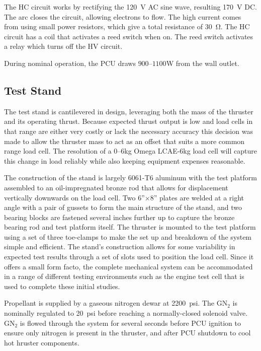 \documentclass[journal]{IEEEtran}
\begin{document}
The HC circuit works by rectifying the \SI{120}{\volt} AC sine wave, resulting \SI{170}{\volt} DC.\@
The arc closes the circuit, allowing electrons to flow.
The high current comes from using small power resistors, which give a total resistance of \SI{30}{\ohm}.
The HC circuit has a coil that activates a reed switch when on.
The reed switch activates a relay which turns off the HV circuit.

During nominal operation, the PCU draws $900$--$1100$\si{\watt} from the wall outlet.

\subsection{Test Stand}
The test stand is cantilevered in design, leveraging both the mass of the thruster and its operating thrust.
Because expected thrust output is low and load cells in that range are either very costly or lack the necessary accuracy this decision was made to allow the thruster mass to act as an offset that suits a more common range load cell.
The resolution of a 0--6\si{\kilo\gram} Omega LCAE-6kg load cell will capture this change in load reliably while also keeping equipment expenses reasonable.

The construction of the stand is largely 6061-T6 aluminum with the test platform assembled to an oil-impregnated bronze rod that allows for displacement vertically downwards on the load cell.
Two 6''$\times$8'' plates are welded at a right angle with a pair of gussets to form the main structure of the stand, and two bearing blocks are fastened several inches further up to capture the bronze bearing rod and test platform itself.
The thruster is mounted to the test platform using a set of three toe-clamps to make the set up and breakdown of the system simple and efficient.
The stand's construction allows for some variability in expected test results through a set of slots used to position the load cell. Since it offers a small form facto, the complete mechanical system can be accommodated in a range of different testing environments such as the engine test cell that is used to complete these initial studies.

Propellant is supplied by a gaseous nitrogen dewar at \SI{2200}{psi}.
The GN$_2$ is nominally regulated to \SI{20}{psi} before reaching a normally-closed solenoid valve.
GN$_2$ is flowed through the system for several seconds before PCU ignition to ensure only nitrogen is present in the thruster, and after PCU shutdown to cool hot hruster components.
\end{document}
